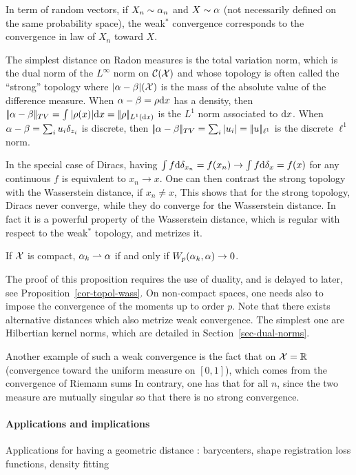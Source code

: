 In term of random vectors, if $X_n \sim \alpha_n$ and $X \sim \alpha$ (not necessarily defined on the same probability space), the weak$^*$ convergence corresponds to the convergence in law of $X_n$ toward $X$.

\begin{defn}
The simplest distance on Radon measures is the total variation norm, which is the dual norm of the $L^\infty$ norm on $\mathcal{C}(\mathcal{X})$ and whose topology is often called the ``strong'' topology
where $|\alpha-\beta|(\mathcal{X})$ is the mass of the absolute value of the difference measure. When $\alpha-\beta=\rho \mathrm{d} x$ has a density, then $|\!| \alpha-\beta |\!|_{TV}=\int |\rho(x)| \mathrm{d} x=|\!| \rho |\!|_{L^1(\mathrm{d} x)}$ is the $L^1$ norm associated to $\mathrm{d} x$. When $\alpha-\beta=\sum_i u_i \delta_{z_i}$ is discrete, then $|\!| \alpha-\beta |\!|_{TV}=\sum_i |u_i|=|\!| u |\!|_{\ell^1}$ is the discrete $\ell^1$ norm. 
\end{defn}

In the special case of Diracs, having $\int f \mathrm{d}\delta_{x_n} = f(x_n) \rightarrow \int f \mathrm{d}\delta_{x} = f(x)$ for any continuous $f$ is equivalent to $x_n \rightarrow x$. One can then contrast the strong topology with the Wasserstein distance, if $x_n \neq x$, 
This shows that for the strong topology, Diracs never converge, while they do converge for the Wasserstein distance. In fact it is a powerful property of the Wasserstein distance, which is regular with respect to the weak$^*$ topology, and metrizes it.

\begin{prop}
	If $\mathcal{X}$ is compact, $\alpha_k \rightharpoonup \alpha$ if and only if $W_p(\alpha_k,\alpha) \rightarrow 0$. 
\end{prop}

The proof of this proposition requires the use of duality, and is delayed to later, see Proposition~\ref{cor-topol-wass}. 
On non-compact spaces, one needs also to impose the convergence of the moments up to order $p$.
%
Note that there exists alternative distances which also metrize weak convergence. The simplest one are Hilbertian kernel norms, which are detailed in Section~\ref{sec-dual-norms}.

Another example of such a weak convergence is the fact that on $\mathcal{X}=\mathbb{R}$
(convergence toward the uniform measure on $[0,1]$), which comes from the convergence of Riemann sums 
In contrary, one has that for all $n$, since the two measure are mutually singular
so that there is no strong convergence. 


 
 
\paragraph{Applications and implications}

Applications for having a geometric distance : barycenters, shape registration loss functions, density fitting